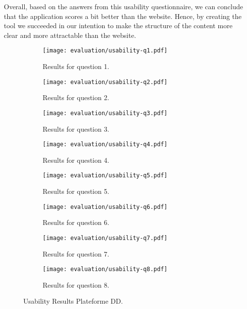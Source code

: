 Overall, based on the answers from this usability questionnaire, we can conclude that the application scores a bit better than the website. Hence, by creating the tool we succeeded in our intention to make the structure of the content more clear and more attractable than the website.


\begin{figure}[h]
	\centering
	\begin{subfigure}{.49\textwidth}
  		\centering
  		\texttt{[image: evaluation/usability-q1.pdf]}
  		\caption{Results for question 1.}
	\end{subfigure}%
	\begin{subfigure}{.49\textwidth}
  		\centering
  		\texttt{[image: evaluation/usability-q2.pdf]}
  		\caption{Results for question 2.}
	\end{subfigure}\par\bigskip
	
	\begin{subfigure}{.49\textwidth}
  		\centering
  		\texttt{[image: evaluation/usability-q3.pdf]}
  		\caption{Results for question 3.}
	\end{subfigure}%
	\begin{subfigure}{.49\textwidth}
  		\centering
  		\texttt{[image: evaluation/usability-q4.pdf]}
  		\caption{Results for question 4.}
	\end{subfigure}\par\bigskip
	
	\begin{subfigure}{.49\textwidth}
  		\centering
  		\texttt{[image: evaluation/usability-q5.pdf]}
  		\caption{Results for question 5.}
	\end{subfigure}%
	\begin{subfigure}{.49\textwidth}
  		\centering
  		\texttt{[image: evaluation/usability-q6.pdf]}
  		\caption{Results for question 6.}
	\end{subfigure}\par\bigskip
	
	\begin{subfigure}{.49\textwidth}
  		\centering
  		\texttt{[image: evaluation/usability-q7.pdf]}
  		\caption{Results for question 7.}
	\end{subfigure}%
	\begin{subfigure}{.49\textwidth}
  		\centering
  		\texttt{[image: evaluation/usability-q8.pdf]}
  		\caption{Results for question 8.}
	\end{subfigure}
	\caption{Usability Results Plateforme DD.}
	\label{fig:evaluation-pdd-usability}
\end{figure}

